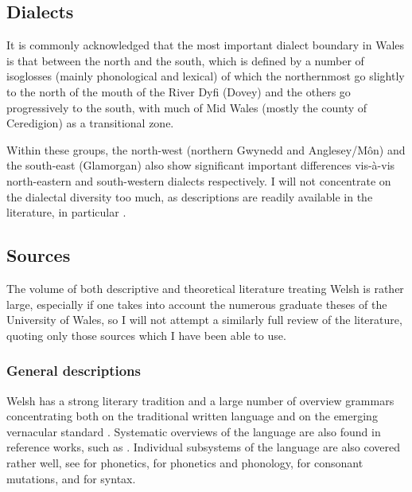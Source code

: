 \subsection{Dialects}
\label{sec:dialects-1}

It is commonly acknowledged that the most important dialect boundary in Wales is that between the north and the south, which is defined by a number of isoglosses (mainly phonological and lexical) of which the northernmost go slightly to the north of the mouth of the River Dyfi (Dovey) and the others go progressively to the south, with much of Mid Wales (mostly the county of Ceredigion) as a transitional zone.

Within these groups, the north\hyp west (northern Gwynedd and Anglesey\fshyp Môn) and the south\hyp east (Glamorgan) also show significant important differences vis-à-vis north\hyp eastern and south\hyp western dialects respectively. I will not concentrate on the dialectal diversity too much, as descriptions are readily available in the literature, \cf in particular \citet{thomas73:_wales,welshphonotactics,awbery09:_welsh,thomas89:_cymraeg_cymra_cymre}.

\subsection{Sources}
\label{sec:sources-welsh}

The volume of both descriptive and theoretical literature treating Welsh is rather large, especially if one takes into account the numerous graduate theses of the University of Wales, so I will not attempt a similarly full review of the literature, quoting only those sources which I have been able to use.

\subsubsection{General descriptions}
\label{sec:general-descriptions-welsh}

Welsh has a strong literary tradition and a large number of overview grammars concentrating both on the traditional written language \citep[\egm][]{wg-mj,welshsyntax,thorne93:_compr_welsh_gramm,gyg} and on the emerging vernacular standard \citep{king}. Systematic overviews of the language are also found in reference works, such as \citet{awbery09:_welsh}. Individual subsystems of the language are also covered rather well, see \citet{ball01:_welsh_phonet} for phonetics, \citet{welshphon} for phonetics and phonology, \citet{miw} for consonant mutations, and \citet{syntaxofwelsh} for syntax.

